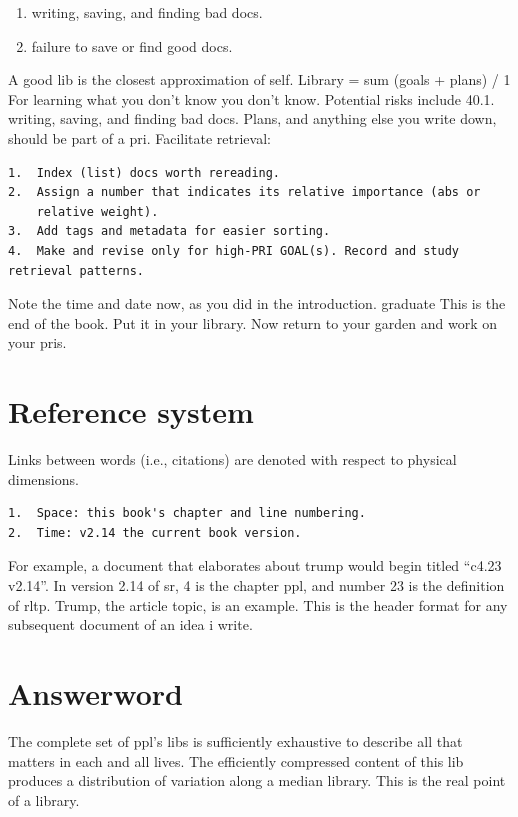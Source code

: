 \documentclass[
]{book}
\providecommand{\tightlist}{%
  \setlength{\itemsep}{0pt}\setlength{\parskip}{0pt}}
\begin{document}
\begin{enumerate}
\def\labelenumi{\arabic{enumi}.}
\tightlist
\item
  writing, saving, and finding bad docs.
\item
  failure to save or find good docs.
\end{enumerate}

A good lib is the closest approximation of self.
Library = sum (goals + plans) / 1
For learning what you don't know you don't know.
Potential risks include 40.1. writing, saving, and finding bad docs.
Plans, and anything else you write down, should be part of a pri.
Facilitate retrieval:

\begin{verbatim}
1.  Index (list) docs worth rereading.
2.  Assign a number that indicates its relative importance (abs or
    relative weight).
3.  Add tags and metadata for easier sorting.
4.  Make and revise only for high-PRI GOAL(s). Record and study retrieval patterns.
\end{verbatim}

Note the time and date now, as you did in the introduction. graduate
This is the end of the book.
Put it in your library.
Now return to your garden and work on your pris.

\hypertarget{reference-system}{%
\section{Reference system}\label{reference-system}}

Links between words (i.e., citations) are denoted with respect to physical dimensions.

\begin{verbatim}
1.  Space: this book's chapter and line numbering.
2.  Time: v2.14 the current book version.
\end{verbatim}

For example, a document that elaborates about trump would begin titled ``c4.23 v2.14''.
In version 2.14 of sr, 4 is the chapter ppl, and number 23 is the definition of rltp. Trump, the article topic, is an example.
This is the header format for any subsequent document of an idea i write.

\hypertarget{answerword}{%
\section{Answerword}\label{answerword}}

The complete set of ppl's libs is sufficiently exhaustive to describe all that matters in each and all lives.
The efficiently compressed content of this lib produces a distribution of variation along a median library.
This is the real point of a library.
\end{document}
